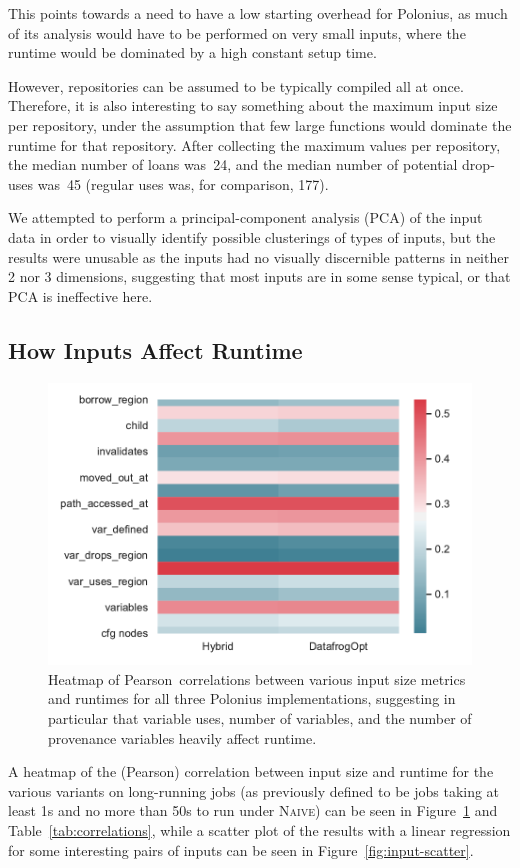 \documentclass[11pt,a4paper,twoside,openany,draft]{report}
\begin{document}
This points towards a need to have a low starting overhead for Polonius, as
much of its analysis would have to be performed on very small inputs, where the
runtime would be dominated by a high constant setup time.

However, repositories can be assumed to be typically compiled all at once.
Therefore, it is also interesting to say something about the maximum input size
per repository, under the assumption that few large functions would dominate the
runtime for that repository. After collecting the maximum values per repository,
the median number of loans was~24, and the median number of potential drop-uses
was~45 (regular uses was, for comparison, 177).

We attempted to perform a principal-component analysis (PCA) of the input data
in order to visually identify possible clusterings of types of inputs, but the
results were unusable as the inputs had no visually discernible patterns in
neither 2 nor 3 dimensions, suggesting that most inputs are in some sense
typical, or that PCA is ineffective here.

\subsection{How Inputs Affect Runtime}\label{sec:inputs:correlation}
\begin{figure}
  \includegraphics[width=0.9\linewidth]{Graphs/corr_heatmap.pdf}
  \caption[Heatmap of Input Sizes Affecting Runtime]{Heatmap of
    Pearson~correlations between various input size metrics and runtimes for
    all three Polonius implementations, suggesting in particular that variable
    uses, number of variables, and the number of provenance variables heavily
    affect runtime.}
  \label{fig:corr-heatmap}
\end{figure}
A heatmap of the (Pearson) correlation between input size and runtime for the
various variants on long-running jobs (as previously defined to be jobs taking
at least 1s and no more than 50s to run under \textsc{Naive}) can be seen in
Figure~\ref{fig:corr-heatmap} and Table~\ref{tab:correlations}, while a scatter
plot of the results with a linear regression for some interesting pairs of
inputs can be seen in Figure~\ref{fig:input-scatter}.
\end{document}
